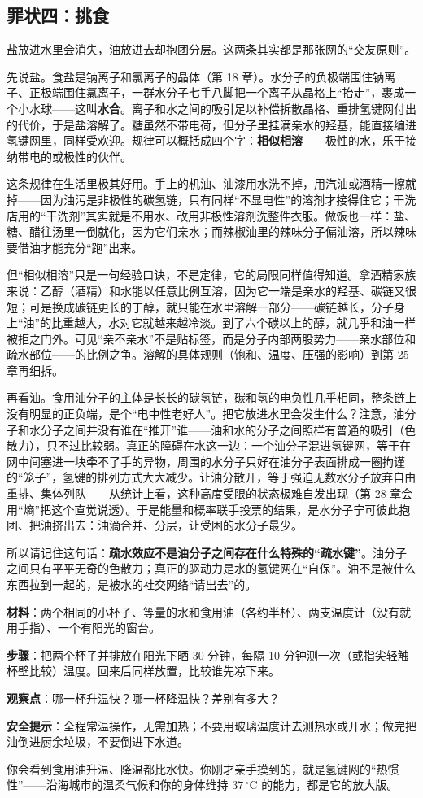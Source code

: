 \subsection{罪状四：挑食}

盐放进水里会消失，油放进去却抱团分层。这两条其实都是那张网的“交友原则”。

先说盐。食盐是钠离子和氯离子的晶体（第 18 章）。水分子的负极端围住钠离子、正极端围住氯离子，一群水分子七手八脚把一个离子从晶格上“抬走”，裹成一个小水球——这叫\textbf{水合}。离子和水之间的吸引足以补偿拆散晶格、重排氢键网付出的代价，于是盐溶解了。糖虽然不带电荷，但分子里挂满亲水的羟基，能直接编进氢键网里，同样受欢迎。规律可以概括成四个字：\textbf{相似相溶}——极性的水，乐于接纳带电的或极性的伙伴。

这条规律在生活里极其好用。手上的机油、油漆用水洗不掉，用汽油或酒精一擦就掉——因为油污是非极性的碳氢链，只有同样“不显电性”的溶剂才接得住它；干洗店用的“干洗剂”其实就是不用水、改用非极性溶剂洗整件衣服。做饭也一样：盐、糖、醋往汤里一倒就化，因为它们亲水；而辣椒油里的辣味分子偏油溶，所以辣味要借油才能充分“跑”出来。

但“相似相溶”只是一句经验口诀，不是定律，它的局限同样值得知道。拿酒精家族来说：乙醇（酒精）和水能以任意比例互溶，因为它一端是亲水的羟基、碳链又很短；可是换成碳链更长的丁醇，就只能在水里溶解一部分——碳链越长，分子身上“油”的比重越大，水对它就越来越冷淡。到了六个碳以上的醇，就几乎和油一样被拒之门外。可见“亲不亲水”不是贴标签，而是分子内部两股势力——亲水部位和疏水部位——的比例之争。溶解的具体规则（饱和、温度、压强的影响）到第 25 章再细拆。

再看油。食用油分子的主体是长长的碳氢链，碳和氢的电负性几乎相同，整条链上没有明显的正负端，是个“电中性老好人”。把它放进水里会发生什么？注意，油分子和水分子之间并没有谁在“推开”谁——油和水的分子之间照样有普通的吸引（色散力），只不过比较弱。真正的障碍在水这一边：一个油分子混进氢键网，等于在网中间塞进一块牵不了手的异物，周围的水分子只好在油分子表面排成一圈拘谨的“笼子”，氢键的排列方式大大减少。让油分散开，等于强迫无数水分子放弃自由重排、集体列队——从统计上看，这种高度受限的状态极难自发出现（第 28 章会用“熵”把这个直觉说透）。于是能量和概率联手投票的结果，是水分子宁可彼此抱团、把油挤出去：油滴合并、分层，让受困的水分子最少。

所以请记住这句话：\textbf{疏水效应不是油分子之间存在什么特殊的“疏水键”}。油分子之间只有平平无奇的色散力；真正的驱动力是水的氢键网在“自保”。油不是被什么东西拉到一起的，是被水的社交网络“请出去”的。

\begin{shiyan}
\textbf{材料}：两个相同的小杯子、等量的水和食用油（各约半杯）、两支温度计（没有就用手指）、一个有阳光的窗台。

\textbf{步骤}：把两个杯子并排放在阳光下晒 30 分钟，每隔 10 分钟测一次（或指尖轻触杯壁比较）温度。回来后同样放置，比较谁先凉下来。

\textbf{观察点}：哪一杯升温快？哪一杯降温快？差别有多大？

\textbf{安全提示}：全程常温操作，无需加热；不要用玻璃温度计去测热水或开水；做完把油倒进厨余垃圾，不要倒进下水道。

你会看到食用油升温、降温都比水快。你刚才亲手摸到的，就是氢键网的“热惯性”——沿海城市的温柔气候和你的身体维持 $37\,^{\circ}\mathrm{C}$ 的能力，都是它的放大版。
\end{shiyan}

